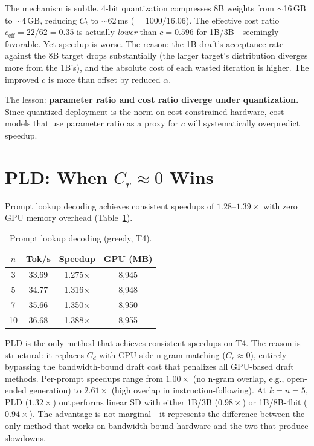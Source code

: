 \documentclass[letterpaper,twocolumn,10pt]{article}
\begin{document}
The mechanism is subtle.
4-bit quantization compresses 8B weights from $\sim$16\,GB to $\sim$4\,GB, reducing $C_t$ to $\sim$62\,ms ($= 1000 / 16.06$).
The effective cost ratio $c_{\text{eff}} = 22/62 = 0.35$ is actually \emph{lower} than $c = 0.596$ for 1B/3B---seemingly favorable.
Yet speedup is worse.
The reason: the 1B draft's acceptance rate against the 8B target drops substantially (the larger target's distribution diverges more from the 1B's), and the absolute cost of each wasted iteration is higher.
The improved $c$ is more than offset by reduced $\alpha$.

The lesson: \textbf{parameter ratio and cost ratio diverge under quantization.}
Since quantized deployment is the norm on cost-constrained hardware, cost models that use parameter ratio as a proxy for $c$ will systematically overpredict speedup.


\section{PLD: When $C_r \approx 0$ Wins}
\label{sec:pld}

Prompt lookup decoding achieves consistent speedups of $1.28$--$1.39\times$ with zero GPU memory overhead (Table~\ref{tab:pld_results}).

\begin{table}[t]
\centering
\small
\caption{Prompt lookup decoding (greedy, T4).}
\label{tab:pld_results}
\smallskip
\begin{tabular}{@{}cccc@{}}
\toprule
$n$ & Tok/s & Speedup & GPU (MB) \\
\midrule
3  & 33.69 & 1.275$\times$ & 8{,}945 \\
5  & 34.77 & 1.316$\times$ & 8{,}948 \\
7  & 35.66 & 1.350$\times$ & 8{,}950 \\
10 & 36.68 & 1.388$\times$ & 8{,}955 \\
\bottomrule
\end{tabular}
\end{table}

PLD is the only method that achieves consistent speedups on T4.
The reason is structural: it replaces $C_d$ with CPU-side n-gram matching ($C_r \approx 0$), entirely bypassing the bandwidth-bound draft cost that penalizes all GPU-based draft methods.
Per-prompt speedups range from $1.00\times$ (no n-gram overlap, e.g., open-ended generation) to $2.61\times$ (high overlap in instruction-following).
At $k = n = 5$, PLD ($1.32\times$) outperforms linear SD with either 1B/3B ($0.98\times$) or 1B/8B-4bit ($0.94\times$).
The advantage is not marginal---it represents the difference between the only method that works on bandwidth-bound hardware and the two that produce slowdowns.
\end{document}

